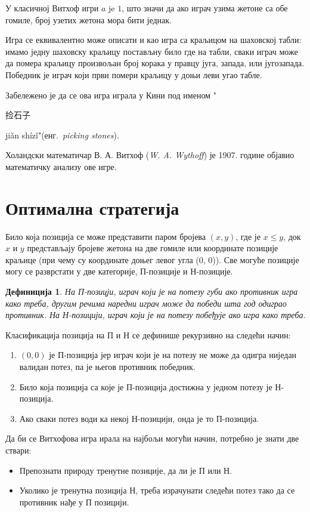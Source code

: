 \documentclass[a4paper]{article}
\newtheorem{definition}{Дефиниција}
\begin{document}
У класичној Витхоф игри $ a $ je $ 1 $, што значи да ако играч узима жетоне са обе гомиле, број узетих жетона мора бити једнак.

Игра се еквивалентно може описати и као игра са краљицом на шаховској табли: имамо једну шаховску краљицу постављну било где на табли, сваки играч може да помера краљицу произвољан број корака у правцу југа, запада, или југозапада. Победник је играч који први помери краљицу у доњи леви угао табле.\cite{cut-the-knot, singingbanana-youtube}

Забележено је да се ова игра играла у Кини  под именом "\begin{CJK}{UTF8}{gbsn}捡石子\end{CJK} jiǎn shízǐ"(енг.{~\em picking stones}). \cite{Yaglom}

Холандски математичар В. А. Витхоф ({\em W. A. Wythoff}) је 1907. године објавио математичку анализу ове игре. \cite{wythoff1907modification}

\section{Оптимална стратегија}
\label{sec:optimalna_strategija}

Било која позиција се може представити паром бројева $ (x, y) $, где је $ x \le  y $, док  $ x $ и $ y $ представљају бројеве жетона на две гомиле или координате позиције краљице (при чему су координате доњег левог угла (0, 0)). Све могуће позиције могу се разврстати у две категорије, П-позиције и Н-позиције. 
\begin{definition}
	На П-позицји, играч који је на потезу губи ако противник игра како треба, другим речима наредни играч може да победи шта год одиграо противник. На Н-позицији, играч који је на потезу побеђује ако игра како треба.
\end{definition}

Класификација позиција на П и Н се дефинише рекурзивно на следећи начин:
\begin{enumerate}
	\item $ (0, 0) $ је П-позиција јер играч који је на потезу не може да одигра ниједан валидан потез, па је његов противник победник.
	\item Било која позиција са које је П-позиција достижна у једном потезу је Н-позиција. 
	\item Ако сваки потез води ка некој Н-позицији, онда је то П-позиција.
\end{enumerate}

Да би се Витхофова игра ирала на најбољи могући начин, потребно је знати две ствари:
\begin{itemize}
	\item Препознати природу тренутне позиције, да ли је П или Н.
	\item Уколико је тренутна позиција Н, треба израчунати следећи потез тако да се противник нађе у П позицији.
\end{itemize}
\end{document}
